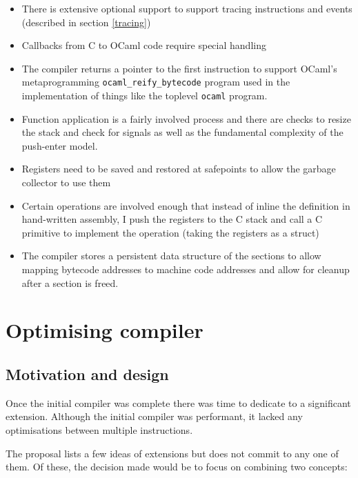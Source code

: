 \begin{itemize}
      \item There is extensive optional support to support tracing instructions and events
            (described
            in section \ref{tracing})
      \item Callbacks from C to OCaml code require special handling
      \item The compiler returns a pointer to the first instruction to support OCaml's
            metaprogramming \texttt{ocaml\_reify\_bytecode} program used in the implementation of
            things like the
            toplevel \texttt{ocaml} program.
      \item Function application is a fairly involved process and there are checks to resize the
            stack and check for signals as well as the fundamental complexity of the push-enter
            model.
      \item Registers need to be saved and restored at safepoints to allow the garbage collector to
            use them
      \item Certain operations are involved enough that instead of inline the definition in
            hand-written assembly, I push the registers to the C stack and call a C primitive to
            implement the
            operation (taking the registers as a struct)
      \item The compiler stores a persistent data structure of the sections to allow mapping
            bytecode addresses to machine code addresses and allow for cleanup after a section is
            freed.
\end{itemize}

\section{Optimising compiler}

\subsection{Motivation and design}

Once the initial compiler was complete there was time to dedicate to a significant extension.
Although the initial compiler was performant, it lacked any optimisations between multiple
instructions.

The proposal lists a few ideas of extensions but does not commit to any one of them. Of these, the
decision made would be to focus on combining two concepts:


